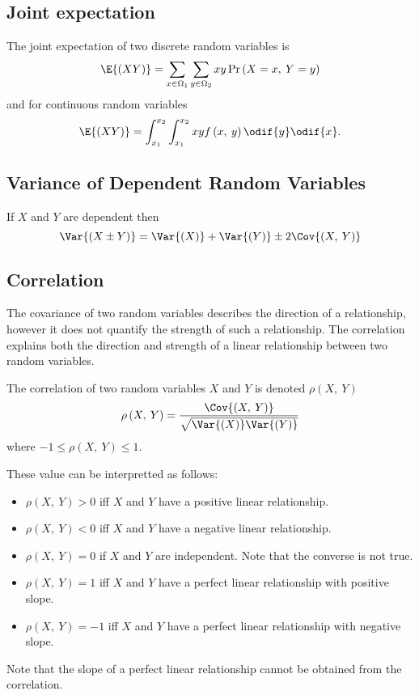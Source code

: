 \documentclass{article}
\begin{document}
\begin{multicols}{3}
    \subsection{Joint expectation}
    The joint expectation of two discrete random variables is
    \begin{equation*}
        \E{\left( XY \right)} = \sum_{x\in\Omega_1} \sum_{y\in\Omega_2} xy \Pr{\left( X = x,\: Y = y \right)}
    \end{equation*}
    and for continuous random variables
    \begin{equation*}
        \E{\left( XY \right)} = \int_{x_1}^{x_2} \int_{x_1}^{x_2} xy f\left( x,\: y \right) \odif{y} \odif{x}.
    \end{equation*}
    \subsection{Variance of Dependent Random Variables}
    If \(X\) and \(Y\) are dependent then
    \begin{equation*}
        \Var{\left( X \pm Y \right)} = \Var{\left( X \right)} + \Var{\left( Y \right)} \pm 2\Cov{\left( X,\: Y \right)}
    \end{equation*}
    \subsection{Correlation}
    The covariance of two random variables describes the direction of a relationship, however
    it does not quantify the strength of such a relationship. The correlation explains both
    the direction and strength of a linear relationship between two random variables.

    The correlation of two random variables \(X\) and \(Y\) is denoted \(\rho\left( X,\: Y \right)\)
    \begin{equation*}
        \rho\left( X,\: Y \right) = \frac{\Cov{\left( X,\: Y \right)}}{\sqrt{\Var{\left( X \right)} \Var{\left( Y \right)}}}
    \end{equation*}
    where \(-1 \leq \rho\left( X,\: Y \right) \leq 1\).

    These value can be interpretted as follows:
    \begin{itemize}
        \item \(\rho\left( X,\: Y \right) > 0\) iff \(X\) and \(Y\) have a positive linear relationship.
        \item \(\rho\left( X,\: Y \right) < 0\) iff \(X\) and \(Y\) have a negative linear relationship.
        \item \(\rho\left( X,\: Y \right) = 0\) if \(X\) and \(Y\) are independent. Note that the converse is not true.
        \item \(\rho\left( X,\: Y \right) = 1\) iff \(X\) and \(Y\) have a perfect linear relationship with positive slope.
        \item \(\rho\left( X,\: Y \right) = -1\) iff \(X\) and \(Y\) have a perfect linear relationship with negative slope.
    \end{itemize}
    Note that the slope of a perfect linear relationship cannot be obtained from the correlation.
\end{multicols}
\end{document}
